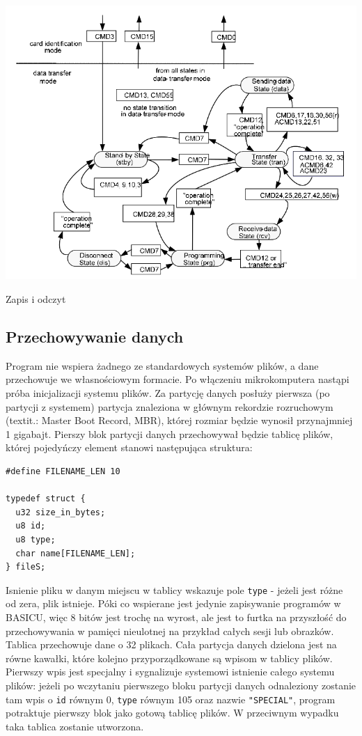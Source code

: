 \documentclass[shortabstract]{iithesis}
\begin{document}
\begingroup
\centering
\includegraphics[width=\textwidth]{sd-transfer.png}
\captionsetup{type=figure}
\caption{Zapis i odczyt}
\endgroup

\subsection{Przechowywanie danych}
Program nie wspiera żadnego ze standardowych systemów plików, a dane przechowuje we własnościowym formacie. Po włączeniu mikrokomputera nastąpi próba inicjalizacji systemu plików. Za partycję danych posłuży pierwsza (po partycji z systemem) partycja znaleziona w głównym rekordzie rozruchowym (textit{.: Master Boot Record, MBR}), której rozmiar będzie wynosił przynajmniej 1 gigabajt. Pierszy blok partycji danych przechowywał będzie tablicę plików, której pojedyńczy element stanowi następująca struktura:
\begin{verbatim}
#define FILENAME_LEN 10

typedef struct {
  u32 size_in_bytes;
  u8 id;
  u8 type;
  char name[FILENAME_LEN];
} fileS;
\end{verbatim}

Isnienie pliku w danym miejscu w tablicy wskazuje pole \texttt{type} - jeżeli jest różne od zera, plik istnieje. Póki co wspierane jest jedynie zapisywanie programów w BASICU, więc 8 bitów jest trochę na wyrost, ale jest to furtka na przyszłość do przechowywania w pamięci nieulotnej na przykład całych sesji lub obrazków. Tablica przechowuje dane o 32 plikach. Cała partycja danych dzielona jest na równe kawałki, które kolejno przyporządkowane są wpisom w tablicy plików. Pierwszy wpis jest specjalny i sygnalizuje systemowi istnienie całego systemu plików: jeżeli po wczytaniu pierwszego bloku partycji danych odnaleziony zostanie tam wpis o \texttt{id} równym 0, \texttt{type} równym 105 oraz nazwie \texttt{"SPECIAL"}, program potraktuje pierwszy blok jako gotową tablicę plików. W przeciwnym wypadku taka tablica zostanie utworzona.
\end{document}
